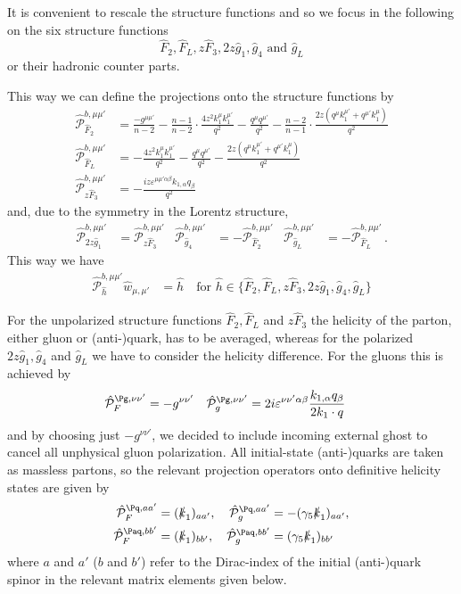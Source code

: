 It is convenient to rescale the structure functions and so we focus in the following on the six structure functions
\begin{equation}
\hat F_2, \hat F_L, z\hat F_3, 2z\hat g_1, \hat g_4 \text{ and } \hat g_L
\end{equation}
or their hadronic counter parts.

This way we can define the projections onto the structure functions by
\begin{align}
\hat{\mathcal P}_{\hat F_2}^{b,\mu\mu'} &= \frac{-g^{\mu\mu'}}{n-2} - \frac{n-1}{n-2} \cdot \frac{4z^2 k_{1}^{\mu}k_{1}^{\mu'}}{q^2} - \frac{q^\mu q^{\mu'}}{q^2} - \frac{n-2}{n-1}\cdot \frac{2z(q^\mu k_{1}^{\mu'} + q^{\mu'}k_{1}^{\mu})}{q^2}\\
\hat{\mathcal P}_{\hat F_L}^{b,\mu\mu'} &= - \frac{4z^2 k_{1}^{\mu}k_{1}^{\mu'}}{q^2} - \frac{q^\mu q^{\mu'}}{q^2} - \frac{2z(q^\mu k_{1}^{\mu'} + q^{\mu'}k_{1}^{\mu})}{q^2}\\
\hat{\mathcal P}_{z\hat F_3}^{b,\mu\mu'} &= -\frac{i z\varepsilon^{\mu\mu'\alpha\beta}k_{1,\alpha}q_\beta}{q^2}
\end{align}
and, due to the symmetry in the Lorentz structure,
\begin{align}
\hat{\mathcal P}_{2z\hat g_1}^{b,\mu\mu'} &= \hat{\mathcal P}_{z\hat F_3}^{b,\mu\mu'}
&\hat{\mathcal P}_{\hat g_4}^{b,\mu\mu'} &= -\hat{\mathcal P}_{\hat F_2}^{b,\mu\mu'}
&\hat{\mathcal P}_{\hat g_L}^{b,\mu\mu'} &= -\hat{\mathcal P}_{\hat F_L}^{b,\mu\mu'}\,.
\end{align}
This way we have
\begin{align}
\hat{\mathcal P}_{\hat h}^{b,\mu\mu'} \hat w_{\mu,\mu'} &= \hat h\quad\text{for }\hat h\in\{\hat F_2,\hat F_L,z\hat F_3,2z\hat g_1,\hat g_4,\hat g_L\}
\end{align}

For the unpolarized structure functions $\hat F_2,\hat F_L$ and $z\hat F_3$ the helicity of the parton, either gluon or (anti-)quark, has to be averaged, whereas for the polarized $2z\hat g_1,\hat g_4$ and $\hat g_L$ we have to consider the helicity difference. For the gluons this is achieved by
\begin{align}
\hat{\mathcal P}_{F}^{\Pg,\nu\nu'} &= - g^{\nu\nu'}
&\hat{\mathcal P}_{g}^{\Pg,\nu\nu'} &= 2i\varepsilon^{\nu\nu'\alpha\beta} \frac{k_{1,\alpha}q_\beta}{2k_1\cdot q}
\end{align}
and by choosing just $- g^{\nu\nu'}$, we decided to include incoming external ghost to cancel all unphysical gluon polarization. All initial-state (anti-)quarks are taken as massless partons, so the relevant projection operators onto definitive helicity states are given by
\begin{align}
\hat{\mathcal P}_{F}^{\Pq,aa'} &= (\slashed k_1)_{aa'},
&\hat{\mathcal P}_{g}^{\Pq,aa'} &= -(\gamma_5\slashed k_1)_{aa'},\nonumber\\
\hat{\mathcal P}_{F}^{\Paq,bb'} &= (\slashed k_1)_{bb'},
&\hat{\mathcal P}_{g}^{\Paq,bb'} &= (\gamma_5\slashed k_1)_{bb'}
\end{align}
where $a$ and $a'$ ($b$ and $b'$) refer to the Dirac-index of the initial (anti-)quark spinor in the relevant matrix elements given below.

